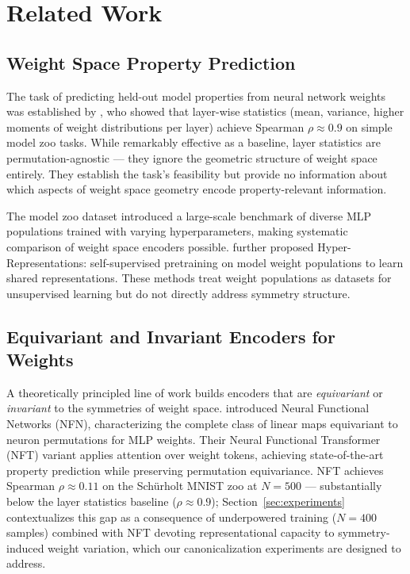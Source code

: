 \section{Related Work}
\label{sec:related}

\subsection{Weight Space Property Prediction}

The task of predicting held-out model properties from neural network weights was established by \citet{Unterthiner2020PredictingNN}, who showed that layer-wise statistics (mean, variance, higher moments of weight distributions per layer) achieve Spearman $\rho \approx 0.9$ on simple model zoo tasks. While remarkably effective as a baseline, layer statistics are permutation-agnostic --- they ignore the geometric structure of weight space entirely. They establish the task's feasibility but provide no information about which aspects of weight space geometry encode property-relevant information.

The \citet{Schurholt2022ModelZoos} model zoo dataset introduced a large-scale benchmark of diverse MLP populations trained with varying hyperparameters, making systematic comparison of weight space encoders possible. \citet{Schurholt2021HyperRepresentations} further proposed Hyper-Representations: self-supervised pretraining on model weight populations to learn shared representations. These methods treat weight populations as datasets for unsupervised learning but do not directly address symmetry structure.

\subsection{Equivariant and Invariant Encoders for Weights}

A theoretically principled line of work builds encoders that are \textit{equivariant} or \textit{invariant} to the symmetries of weight space. \citet{Zhou2023NeuralFunctionalNetworks} introduced Neural Functional Networks (NFN), characterizing the complete class of linear maps equivariant to neuron permutations for MLP weights. Their Neural Functional Transformer (NFT) variant applies attention over weight tokens, achieving state-of-the-art property prediction while preserving permutation equivariance. NFT achieves Spearman $\rho \approx 0.11$ on the Schürholt MNIST zoo at $N=500$ --- substantially below the layer statistics baseline ($\rho \approx 0.9$); Section~\ref{sec:experiments} contextualizes this gap as a consequence of underpowered training ($N=400$ samples) combined with NFT devoting representational capacity to symmetry-induced weight variation, which our canonicalization experiments are designed to address.


